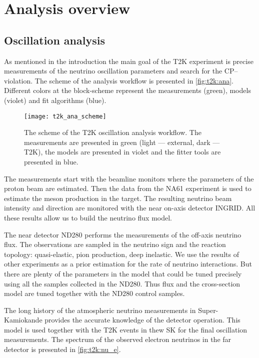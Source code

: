 \documentclass[../main.tex]{subfiles}
\begin{document}
\section{Analysis overview}
\subsection{Oscillation analysis}
As mentioned in the introduction the main goal of the T2K experiment is precise measurements of the neutrino oscillation parameters and search for the CP--violation. The scheme of the analysis workflow is presented in \autoref{fig:t2k:ana}. Different colors at the block-scheme represent the measurements (green), models (violet) and fit algorithms (blue).

\begin{figure}[ht!]
  \centering
  \texttt{[image: t2k\_ana\_scheme]}
  \caption{The scheme of the T2K oscillation analysis workflow. The measurements are presented in green (light --- external, dark --- T2K), the models are presented in violet and the fitter tools are presented in blue.}
  \label{fig:t2k:ana}
\end{figure}

The measurements start with the beamline monitors where the parameters of the proton beam are estimated. Then the data from the NA61 experiment is used to estimate the meson production in the target. The resulting neutrino beam intensity and direction are monitored with the near on-axis detector INGRID. All these results allow us to build the neutrino flux model.

The near detector ND280 performs the measurements of the off-axis neutrino flux. The observations are sampled in the neutrino sign and the reaction topology: quasi-elastic, pion production, deep inelastic. We use the results of other experiments as a prior estimation for the rate of neutrino interactions. But there are plenty of the parameters in the model that could be tuned precisely using all the samples collected in the ND280. Thus flux and the cross-section model are tuned together with the ND280 control samples.

The long history of the atmospheric neutrino measurements in Super-Kamiokande provides the accurate knowledge of the detector operation. This model is used together with the T2K events in thew SK for the final oscillation measurements. The spectrum of the observed electron neutrinos in the far detector is presented in \autoref{fig:t2k:nu_e}.
\end{document}
